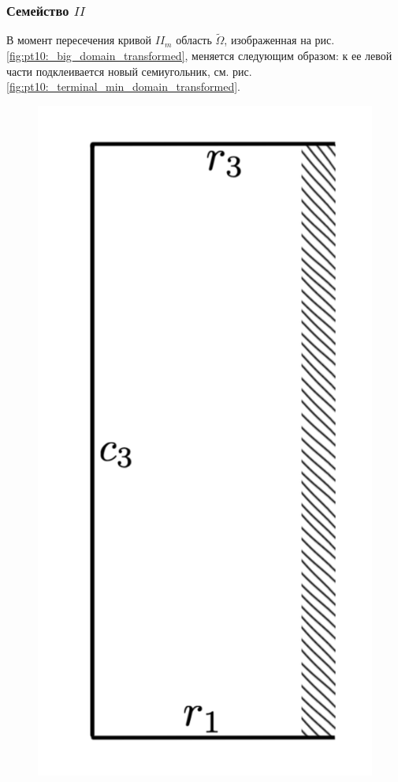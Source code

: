  \subsubsection{Семейство $II$}
 В момент пересечения кривой $II_m$ область $\widetilde{\Omega}$, изображенная на рис.     \ref{fig:pt10:_big_domain_transformed}, меняется следующим образом:
 к ее левой части подклеивается новый семиугольник, см. рис.     \ref{fig:pt10:_terminal_min_domain_transformed}.
 \begin{figure}[!htb]
\centering
\includegraphics[scale=0.12]{images/section3_circular/atoms/II/before/before_page_segment.pdf}

\end{figure}
